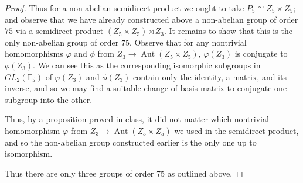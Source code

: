\documentclass[11pt]{article}
\DeclareMathOperator\Aut{Aut}
\begin{document}
\begin{enumerate}
\begin{proof}
      Thus for a non-abelian semidirect product we ought to take $P_5 \cong Z_5\times Z_5$; and observe that we have already constructed above a non-abelian group of order $75$ via a semidirect product $(Z_5\times Z_5)\rtimes Z_3$. It remains to show that this is the only non-abelian group of order $75$. Observe that for any nontrivial homomorphisms $\varphi$ and $\phi$ from $Z_3\to \Aut(Z_5\times Z_5)$,  $\varphi(Z_3)$ is conjugate to $\phi(Z_3)$. We can see this as the corresponding isomorphic subgroups in $GL_2(\mathbb{F}_5)$ of $\varphi(Z_3)$ and $\phi(Z_3)$ contain only the identity, a matrix, and its inverse, and so we may find a suitable change of basis matrix to conjugate one subgroup into the other.

      Thus, by a proposition proved in class, it did not matter which nontrivial homomorphism $\varphi$ from $Z_3\to \Aut(Z_5\times Z_5)$ we used in the semidirect product, and so the non-abelian group constructed earlier is the only one up to isomorphism.

      Thus there are only three groups of order $75$ as outlined above.
    \end{proof}
\end{enumerate}
\end{document}
